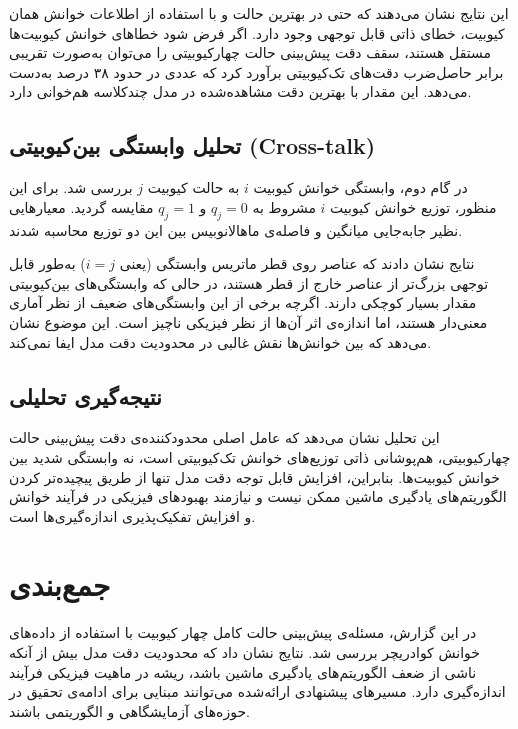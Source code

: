 این نتایج نشان می‌دهند که حتی در بهترین حالت و با استفاده از اطلاعات خوانش همان کیوبیت، خطای ذاتی قابل توجهی وجود دارد. اگر فرض شود خطاهای خوانش کیوبیت‌ها مستقل هستند، سقف دقت پیش‌بینی حالت چهارکیوبیتی را می‌توان به‌صورت تقریبی برابر حاصل‌ضرب دقت‌های تک‌کیوبیتی برآورد کرد که عددی در حدود ۳۸ درصد به‌دست می‌دهد. این مقدار با بهترین دقت مشاهده‌شده در مدل چندکلاسه هم‌خوانی دارد.

\subsection{تحلیل وابستگی بین‌کیوبیتی (Cross-talk)}
در گام دوم، وابستگی خوانش کیوبیت $i$ به حالت کیوبیت $j$ بررسی شد. برای این منظور، توزیع خوانش کیوبیت $i$ مشروط به $q_j=0$ و $q_j=1$ مقایسه گردید. معیارهایی نظیر جابه‌جایی میانگین و فاصله‌ی ماهالانوبیس بین این دو توزیع محاسبه شدند.

نتایج نشان دادند که عناصر روی قطر ماتریس وابستگی (یعنی $i=j$) به‌طور قابل توجهی بزرگ‌تر از عناصر خارج از قطر هستند، در حالی که وابستگی‌های بین‌کیوبیتی مقدار بسیار کوچکی دارند. اگرچه برخی از این وابستگی‌های ضعیف از نظر آماری معنی‌دار هستند، اما اندازه‌ی اثر آن‌ها از نظر فیزیکی ناچیز است. این موضوع نشان می‌دهد که  بین خوانش‌ها نقش غالبی در محدودیت دقت مدل ایفا نمی‌کند.

\subsection{نتیجه‌گیری تحلیلی}
این تحلیل نشان می‌دهد که عامل اصلی محدودکننده‌ی دقت پیش‌بینی حالت چهارکیوبیتی، هم‌پوشانی ذاتی توزیع‌های خوانش تک‌کیوبیتی است، نه وابستگی شدید بین خوانش کیوبیت‌ها. بنابراین، افزایش قابل توجه دقت مدل تنها از طریق پیچیده‌تر کردن الگوریتم‌های یادگیری ماشین ممکن نیست و نیازمند بهبودهای فیزیکی در فرآیند خوانش و افزایش تفکیک‌پذیری اندازه‌گیری‌ها است.


\section{جمع‌بندی}
در این گزارش، مسئله‌ی پیش‌بینی حالت کامل چهار کیوبیت با استفاده از داده‌های خوانش کوادریچر بررسی شد. نتایج نشان داد که محدودیت دقت مدل بیش از آنکه ناشی از ضعف الگوریتم‌های یادگیری ماشین باشد، ریشه در ماهیت فیزیکی فرآیند اندازه‌گیری دارد. مسیرهای پیشنهادی ارائه‌شده می‌توانند مبنایی برای ادامه‌ی تحقیق در حوزه‌های آزمایشگاهی و الگوریتمی باشند.


